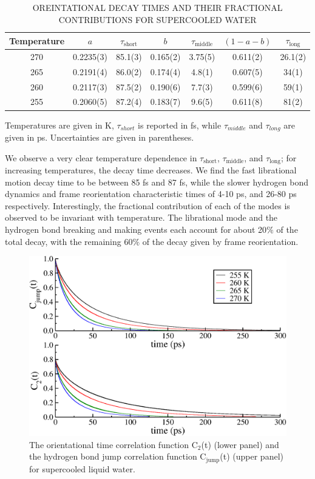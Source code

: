 \begin{table}[h] \centering \caption{OREINTATIONAL DECAY TIMES AND
    THEIR FRACTIONAL CONTRIBUTIONS FOR SUPERCOOLED WATER\label{tab:supOrient}}
\begin{tabular}{ccccccc}
\hline
\hline
 Temperature & $a$ & $\tau_\mathrm{short}$& $b$ &
                                                  $\tau_\mathrm{middle}$
  & $(1-a-b)$ & $\tau_\mathrm{long}$\\
\hline
270 &0.2235(3) &85.1(3) & 0.165(2) & 3.75(5) & 0.611(2) & 26.1(2)\\
265 &0.2191(4) &86.0(2) & 0.174(4) & 4.8(1) & 0.607(5) & 34(1)\\
260 &0.2117(3) &87.5(2) & 0.190(6) & 7.7(3) & 0.599(6) & 59(1)\\
255 &0.2060(5) &87.2(4) & 0.183(7) & 9.6(5) & 0.611(8) & 81(2)\\
\hline
\hline
\end{tabular}
\begin{flushleft}
Temperatures are given in K, $\tau_{short}$ is reported in fs, while $\tau_{middle}$ and
$\tau_{long}$ are given in ps. Uncertainties are given in parentheses.
\end{flushleft}
\end{table}

We observe a very clear temperature dependence in
$\tau_\mathrm{short}$, $\tau_\mathrm{middle}$, and
$\tau_\mathrm{long}$; for increasing temperatures, the decay time
decreases. We find the fast librational motion decay time to be
between 85 fs and 87 fs, while the slower hydrogen bond dynamics and
frame reorientation characteristic times of 4-10 ps, and 26-80 ps
respectively.  Interestingly, the fractional contribution of each of
the modes is observed to be invariant with temperature. The
librational mode and the hydrogen bond breaking and making events each
account for about 20$\%$ of the total decay, with the remaining 60$\%$
of the decay given by frame reorientation.


\begin{figure}
\includegraphics[width=\linewidth]{Figures/jump_lcorr}
\caption{\label{fig:jump_lcorr} The orientational time correlation
  function C$_2$(t) (lower panel) and the hydrogen bond jump
  correlation function C$_\mathrm{jump}$(t) (upper panel) for
  supercooled liquid water. }
\end{figure}                


